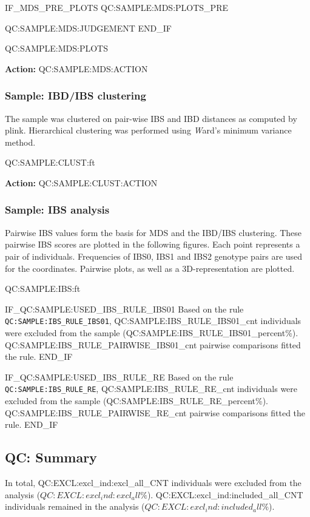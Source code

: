 IF_MDS_PRE_PLOTS
	QC:SAMPLE:MDS:PLOTS_PRE

	QC:SAMPLE:MDS:JUDGEMENT
END_IF

QC:SAMPLE:MDS:PLOTS

{\bf Action:} QC:SAMPLE:MDS:ACTION

\subsubsection{Sample: IBD/IBS clustering}

The sample was clustered on pair-wise IBS and IBD distances as computed by plink. Hierarchical clustering was performed using {\emph Ward's} minimum variance method.

QC:SAMPLE:CLUST:ft

{\bf Action:} QC:SAMPLE:CLUST:ACTION


\subsubsection{Sample: IBS analysis}

Pairwise IBS values form the basis for MDS and the IBD/IBS clustering. These pairwise IBS scores are plotted in the following figures. Each point represents a pair of individuals. Frequencies of IBS0, IBS1 and IBS2 genotype pairs are used for the coordinates. Pairwise plots, as well as a 3D-representation are plotted.

QC:SAMPLE:IBS:ft

IF_QC:SAMPLE:USED_IBS_RULE_IBS01
Based on the rule \texttt{QC:SAMPLE:IBS_RULE_IBS01}, QC:SAMPLE:IBS_RULE_IBS01_cnt individuals were excluded from the sample (QC:SAMPLE:IBS_RULE_IBS01_percent\%). QC:SAMPLE:IBS_RULE_PAIRWISE_IBS01_cnt pairwise comparisons fitted the rule.
END_IF

IF_QC:SAMPLE:USED_IBS_RULE_RE
Based on the rule \texttt{QC:SAMPLE:IBS_RULE_RE}, QC:SAMPLE:IBS_RULE_RE_cnt individuals were excluded from the sample (QC:SAMPLE:IBS_RULE_RE_percent\%). QC:SAMPLE:IBS_RULE_PAIRWISE_RE_cnt pairwise comparisons fitted the rule.
END_IF

\subsection{QC: Summary}

In total, QC:EXCL:excl_ind:excl_all_CNT individuals were excluded from the analysis ($QC:EXCL:excl_ind:excl_all\%$). QC:EXCL:excl_ind:included_all_CNT individuals remained in the analysis ($QC:EXCL:excl_ind:included_all\%$).


